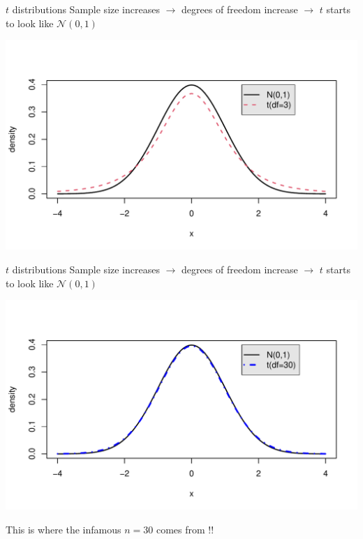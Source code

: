 \documentclass[10pt]{beamer}\usepackage[]{graphicx}\usepackage[]{color}
\makeatletter
\def\maxwidth{ %
  \ifdim\Gin@nat@width>\linewidth
    \linewidth
  \else
    \Gin@nat@width
  \fi
}
\newenvironment{knitrout}{}{} %
\makeatother
\begin{document}
\begin{frame}[fragile]{$t$ distributions}
	Sample size increases $\rightarrow$ degrees of freedom increase $\rightarrow$ $t$ starts to look like $\mathcal{N}(0,1)$
\begin{knitrout}\tiny
{}\color{fgcolor}

{\centering \includegraphics[width=\maxwidth]{figure/unnamed-chunk-9-1} 

}


\end{knitrout}
\end{frame}

\begin{frame}[fragile]{$t$ distributions}
	Sample size increases $\rightarrow$ degrees of freedom increase $\rightarrow$ $t$ starts to look like $\mathcal{N}(0,1)$
\begin{knitrout}\tiny
{}\color{fgcolor}

{\centering \includegraphics[width=\maxwidth]{figure/unnamed-chunk-10-1} 

}


\end{knitrout}
	
	\Large This is where the infamous $n=30$ comes from !!
\end{frame}
\end{document}
